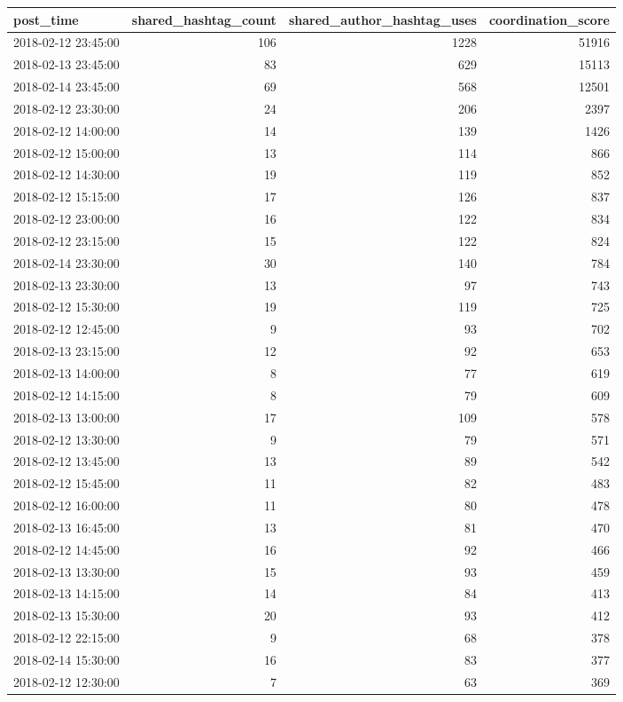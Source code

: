 \begin{tabular}{lrrr}
\toprule
post\_time & shared\_hashtag\_count & shared\_author\_hashtag\_uses & coordination\_score \\
\midrule
2018-02-12 23:45:00 & 106 & 1228 & 51916 \\
2018-02-13 23:45:00 & 83 & 629 & 15113 \\
2018-02-14 23:45:00 & 69 & 568 & 12501 \\
2018-02-12 23:30:00 & 24 & 206 & 2397 \\
2018-02-12 14:00:00 & 14 & 139 & 1426 \\
2018-02-12 15:00:00 & 13 & 114 & 866 \\
2018-02-12 14:30:00 & 19 & 119 & 852 \\
2018-02-12 15:15:00 & 17 & 126 & 837 \\
2018-02-12 23:00:00 & 16 & 122 & 834 \\
2018-02-12 23:15:00 & 15 & 122 & 824 \\
2018-02-14 23:30:00 & 30 & 140 & 784 \\
2018-02-13 23:30:00 & 13 & 97 & 743 \\
2018-02-12 15:30:00 & 19 & 119 & 725 \\
2018-02-12 12:45:00 & 9 & 93 & 702 \\
2018-02-13 23:15:00 & 12 & 92 & 653 \\
2018-02-13 14:00:00 & 8 & 77 & 619 \\
2018-02-12 14:15:00 & 8 & 79 & 609 \\
2018-02-13 13:00:00 & 17 & 109 & 578 \\
2018-02-12 13:30:00 & 9 & 79 & 571 \\
2018-02-12 13:45:00 & 13 & 89 & 542 \\
2018-02-12 15:45:00 & 11 & 82 & 483 \\
2018-02-12 16:00:00 & 11 & 80 & 478 \\
2018-02-13 16:45:00 & 13 & 81 & 470 \\
2018-02-12 14:45:00 & 16 & 92 & 466 \\
2018-02-13 13:30:00 & 15 & 93 & 459 \\
2018-02-13 14:15:00 & 14 & 84 & 413 \\
2018-02-13 15:30:00 & 20 & 93 & 412 \\
2018-02-12 22:15:00 & 9 & 68 & 378 \\
2018-02-14 15:30:00 & 16 & 83 & 377 \\
2018-02-12 12:30:00 & 7 & 63 & 369 \\

\end{tabular}
